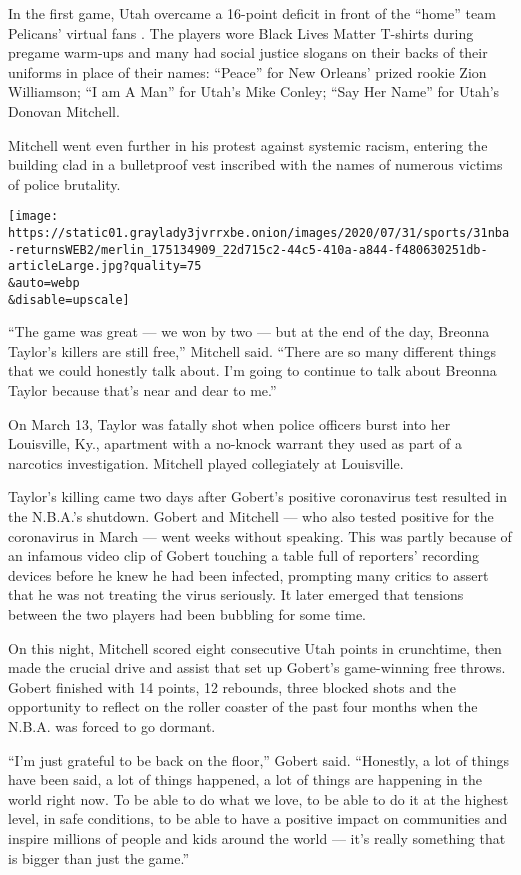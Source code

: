 In the first game, Utah overcame a 16-point deficit in front of the
``home'' team Pelicans' virtual fans . The players wore Black Lives
Matter T-shirts during pregame warm-ups and many had social justice
slogans on their backs of their uniforms in place of their names:
``Peace'' for New Orleans' prized rookie Zion Williamson; ``I am A Man''
for Utah's Mike Conley; ``Say Her Name'' for Utah's Donovan Mitchell.

Mitchell went even further in his protest against systemic racism,
entering the building clad in a bulletproof vest inscribed with the
names of numerous victims of police brutality.

\texttt{[image: https://static01.graylady3jvrrxbe.onion/images/2020/07/31/sports/31nba-returnsWEB2/merlin\_175134909\_22d715c2-44c5-410a-a844-f480630251db-articleLarge.jpg?quality=75\\\&auto=webp\\\&disable=upscale]}

``The game was great --- we won by two --- but at the end of the day,
Breonna Taylor's killers are still free,'' Mitchell said. ``There are so
many different things that we could honestly talk about. I'm going to
continue to talk about Breonna Taylor because that's near and dear to
me.''

On March 13, Taylor was fatally shot when police officers burst into her
Louisville, Ky., apartment with a no-knock warrant they used as part of
a narcotics investigation. Mitchell played collegiately at Louisville.

Taylor's killing came two days after Gobert's positive coronavirus test
resulted in the N.B.A.'s shutdown. Gobert and Mitchell --- who also
tested positive for the coronavirus in March --- went weeks without
speaking. This was partly because of an infamous video clip of Gobert
touching a table full of reporters' recording devices before he knew he
had been infected, prompting many critics to assert that he was not
treating the virus seriously. It later emerged that tensions between the
two players had been bubbling for some time.

On this night, Mitchell scored eight consecutive Utah points in
crunchtime, then made the crucial drive and assist that set up Gobert's
game-winning free throws. Gobert finished with 14 points, 12 rebounds,
three blocked shots and the opportunity to reflect on the roller coaster
of the past four months when the N.B.A. was forced to go dormant.

``I'm just grateful to be back on the floor,'' Gobert said. ``Honestly,
a lot of things have been said, a lot of things happened, a lot of
things are happening in the world right now. To be able to do what we
love, to be able to do it at the highest level, in safe conditions, to
be able to have a positive impact on communities and inspire millions of
people and kids around the world --- it's really something that is
bigger than just the game.''


